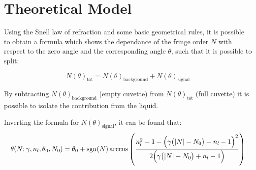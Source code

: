 \documentclass[a4paper, 12pt]{article}
\begin{document}


\section{Theoretical Model}\label{sez:TM}

Using the Snell law of refraction and some basic geometrical rules, it is possible to obtain a formula which shows the dependance of the fringe order \(N\) with respect to the zero angle and the corresponding angle $\theta $, such that it is possible to split:

\begin{equation}
  N(\theta)_{\text{tot}}  =
  N(\theta)_{\text{background}}  +
  N(\theta)_{\text{signal}}
\end{equation}

By subtracting $N(\theta)_{\text{background}}$ (empty cuvette) from $N(\theta)_{\text{tot}}$ (full cuvette) it is possible to isolate the contribution from the liquid. 

Inverting the formula for $N(\theta)_{\text{signal}}$, it can be found that: 
\begin{equation}
\theta (N; \gamma, n_l, \theta_0, N_0 )
=\theta_0  +
\operatorname{sgn}(N) \operatorname{arccos}\qty(\frac{
n_l^2-1-\qty(\gamma \qty(\abs{N}-N_0) + n_l - 1)^2
}{
2 \qty(\gamma \qty(\abs{N}-N_0)+n_l -1)
})
\end{equation}
\end{document}
